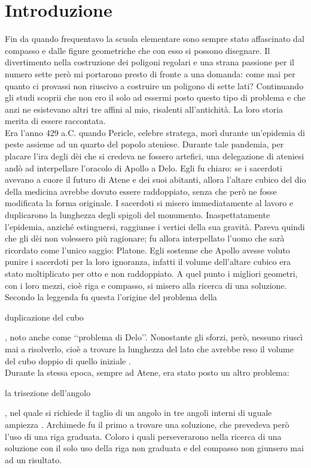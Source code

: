 

\chapter*{Introduzione}

Fin da quando frequentavo la scuola elementare sono sempre stato affascinato dal compasso e dalle figure geometriche che con esso si possono disegnare. Il divertimento nella costruzione dei poligoni regolari e una strana passione per il numero sette però mi portarono presto di fronte a una domanda: come mai per quanto ci provassi non riuscivo a costruire un poligono di sette lati?
Continuando gli studi scoprii che non ero il solo ad essermi posto questo tipo di problema e che anzi ne esistevano altri tre affini al mio, risalenti all'antichità. La loro storia merita di essere raccontata. \\


Era l'anno 429 a.C. quando Pericle, celebre stratega, morì durante un'epidemia di peste assieme ad un quarto del popolo ateniese.  
Durante tale pandemia, per placare l'ira degli dèi che si credeva ne fossero artefici, una delegazione di ateniesi andò ad interpellare l'oracolo di Apollo a Delo. Egli fu chiaro: se i sacerdoti avevano a cuore il futuro di Atene e dei suoi abitanti, allora l'altare cubico del dio della medicina avrebbe dovuto essere raddoppiato, senza che però ne fosse modificata la forma originale. 
I sacerdoti si misero immediatamente al lavoro e duplicarono la lunghezza degli spigoli del monumento. Inaspettatamente l'epidemia, anziché estinguersi, raggiunse i vertici della sua gravità. Pareva quindi che gli dèi non volessero più ragionare; fu allora interpellato l'uomo che sarà ricordato come l'unico saggio: Platone. Egli sostenne che Apollo avesse voluto punire i sacerdoti per la loro ignoranza, infatti il volume dell'altare cubico era stato moltiplicato per otto e non raddoppiato. A quel punto i migliori geometri, con i loro mezzi, cioè riga e compasso, si misero alla ricerca di una soluzione. Secondo la leggenda fu questa l'origine del problema della  \begin{bfseries}duplicazione del cubo\end{bfseries}, noto anche come \lq\lq problema di Delo\rq\rq. Nonostante gli sforzi, però, nessuno riuscì mai a risolverlo, cioè a trovare la lunghezza del lato che avrebbe reso il volume del cubo doppio di quello iniziale \cite{Boyer}.\\

Durante la stessa epoca, sempre ad Atene, era stato posto un altro problema: \begin{bfseries}la trisezione dell'angolo\end{bfseries}, nel quale si richiede il taglio di un angolo in tre angoli interni di uguale ampiezza \cite{sito3}. Archimede fu il primo a trovare una soluzione, che prevedeva però l'uso di una riga graduata. Coloro i quali perseverarono nella ricerca di una soluzione con il solo uso della riga non graduata e del compasso non giunsero mai ad un risultato.\\

